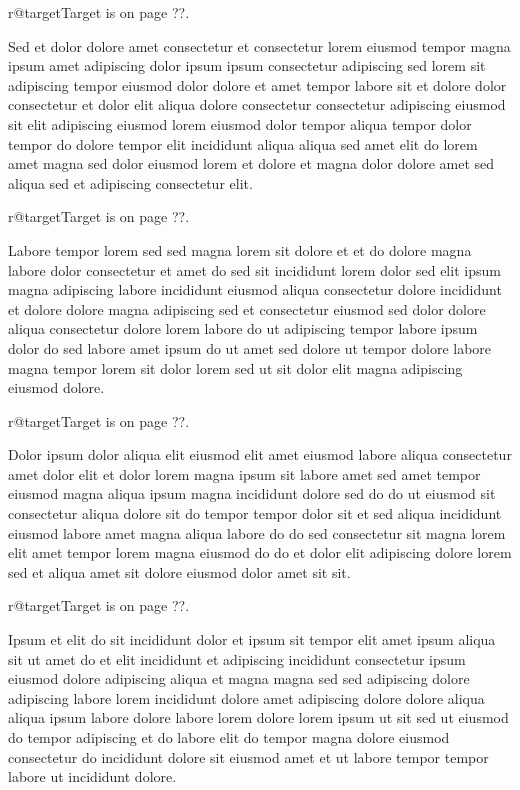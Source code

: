 \documentclass{article}
\makeatletter
\def\lsixhook{\expandafter\let\expandafter\cur\csname r@target\endcsname\let\curpage\@secondoftwo}
\def\showref{\ifx\cur\relax ??\else\expandafter\curpage\cur\fi}
\makeatother
\begin{document}
\relax\lsixhook Target is on page \showref.

Sed et dolor dolore amet consectetur et consectetur lorem eiusmod tempor magna ipsum amet adipiscing dolor ipsum ipsum consectetur adipiscing sed lorem sit adipiscing tempor eiusmod dolor dolore et amet tempor labore sit et dolore dolor consectetur et dolor elit aliqua dolore consectetur consectetur adipiscing eiusmod sit elit adipiscing eiusmod lorem eiusmod dolor tempor aliqua tempor dolor tempor do dolore tempor elit incididunt aliqua aliqua sed amet elit do lorem amet magna sed dolor eiusmod lorem et dolore et magna dolor dolore amet sed aliqua sed et adipiscing consectetur elit.

\relax\lsixhook Target is on page \showref.

Labore tempor lorem sed sed magna lorem sit dolore et et do dolore magna labore dolor consectetur et amet do sed sit incididunt lorem dolor sed elit ipsum magna adipiscing labore incididunt eiusmod aliqua consectetur dolore incididunt et dolore dolore magna adipiscing sed et consectetur eiusmod sed dolor dolore aliqua consectetur dolore lorem labore do ut adipiscing tempor labore ipsum dolor do sed labore amet ipsum do ut amet sed dolore ut tempor dolore labore magna tempor lorem sit dolor lorem sed ut sit dolor elit magna adipiscing eiusmod dolore.

\relax\lsixhook Target is on page \showref.

Dolor ipsum dolor aliqua elit eiusmod elit amet eiusmod labore aliqua consectetur amet dolor elit et dolor lorem magna ipsum sit labore amet sed amet tempor eiusmod magna aliqua ipsum magna incididunt dolore sed do do ut eiusmod sit consectetur aliqua dolore sit do tempor tempor dolor sit et sed aliqua incididunt eiusmod labore amet magna aliqua labore do do sed consectetur sit magna lorem elit amet tempor lorem magna eiusmod do do et dolor elit adipiscing dolore lorem sed et aliqua amet sit dolore eiusmod dolor amet sit sit.

\relax\lsixhook Target is on page \showref.

Ipsum et elit do sit incididunt dolor et ipsum sit tempor elit amet ipsum aliqua sit ut amet do et elit incididunt et adipiscing incididunt consectetur ipsum eiusmod dolore adipiscing aliqua et magna magna sed sed adipiscing dolore adipiscing labore lorem incididunt dolore amet adipiscing dolore dolore aliqua aliqua ipsum labore dolore labore lorem dolore lorem ipsum ut sit sed ut eiusmod do tempor adipiscing et do labore elit do tempor magna dolore eiusmod consectetur do incididunt dolore sit eiusmod amet et ut labore tempor tempor labore ut incididunt dolore.
\end{document}
